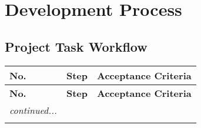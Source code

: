 \documentclass[11pt]{article}
\begin{document}
	\section{Development Process}
		\subsection{Project Task Workflow} %
		
			\begin{longtable}{p{} p{} p{}}
				\toprule
				\textbf{No.} & \textbf{Step} & \textbf{Acceptance Criteria} \\
				\toprule
				\endfirsthead
				
				\toprule
				\textbf{No.} & \textbf{Step} & \textbf{Acceptance Criteria}	\\
				\toprule
				\endhead
				
				\midrule
				\textit{continued...} & & \\
				\bottomrule
				\endfoot
				
				\endlastfoot
				

\end{longtable}
\end{document}
